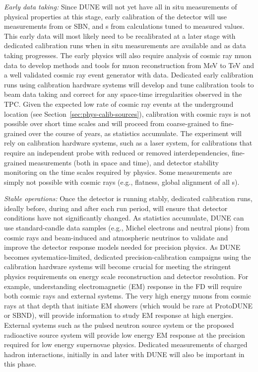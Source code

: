 \textit{Early data taking:} Since DUNE will not yet have all in situ measurements of \lar physical properties at this stage, early calibration of the detector will use \lar measurements from  or SBN, and \efield{}s from calculations tuned to measured  values.
This early data will most likely need to be recalibrated at a later stage with dedicated calibration runs when in situ measurements are available and as data taking progresses. 
The early physics will also require analysis of cosmic ray muon data to develop methods and tools for muon reconstruction from MeV to TeV and a well validated cosmic ray event generator with data. 
Dedicated early calibration runs using calibration hardware systems will develop and tune calibration tools to beam data taking and correct for any space-time irregularities observed in the TPC. Given the expected low rate of cosmic ray events at the underground location (see Section~\ref{sec:phys-calib-sources}), calibration with cosmic rays is not possible over short time scales and will proceed from coarse-grained to fine-grained over the course of years, as statistics accumulate. 
The experiment will rely on calibration hardware systems, such as a laser system, for calibrations that require an independent probe with reduced or removed interdependencies, fine-grained measurements (both in space and time), and detector stability monitoring on the time scales required by physics. Some measurements are simply not possible with cosmic rays (e.g.,  flatness, global alignment of all s). 

\textit{Stable operations:} Once the detector is running stably, dedicated calibration runs, ideally before, during and after each run period, will ensure that detector conditions have not significantly changed.
As statistics accumulate, DUNE can use standard-candle data samples (e.g., Michel electrons and neutral pions) from cosmic rays and beam-induced and atmospheric neutrinos to validate and improve the detector response models needed for precision physics. 
As DUNE becomes systematics-limited, dedicated precision-calibration campaigns using the calibration hardware systems will become crucial for meeting the stringent physics requirements on energy scale reconstruction and detector resolution. For example, understanding electromagnetic (EM) response in the FD will require both cosmic rays
and external systems. The very high energy muons from cosmic rays at that depth that initiate
EM showers (which would be rare at ProtoDUNE or SBND), will provide information to study EM response at high energies. External systems such as the pulsed neutron source system or the proposed radioactive source system will provide low energy EM response at the precision required for low energy supernovae
physics. Dedicated measurements of charged hadron interactions, initially in  and later with DUNE  will also be important in this phase.







